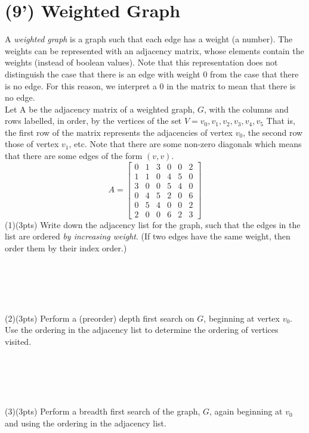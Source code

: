 \documentclass{article}
\begin{document}
\section{(9') Weighted Graph}
A \textit{weighted graph} is a graph such that each edge has a weight (a number). The weights can be represented with an adjacency matrix, whose elements contain the weights (instead of boolean values). Note that this representation does not distinguish the case that there is an edge with weight 0 from the case that there is no edge. For this reason, we interpret a 0 in the matrix to mean that there is no edge.\\
Let A be the adjacency matrix of a weighted graph, $ G $, with the columns and rows labelled, in order, by the vertices of the set $ V = {v_0, v_1, v_2, v_3, v_4, v_5} $ That is, the first row of the matrix represents the adjacencies of vertex $v_0$, the second row those of vertex $v_1$, etc. Note that there are some non-zero diagonals which means that there are some edges of the form $(v, v)$.
$$
A = \left[
\begin{matrix}
0 & 1 & 3 & 0 & 0 & 2 \\
1 & 1 & 0 & 4 & 5 & 0 \\
3 & 0 & 0 & 5 & 4 & 0 \\
0 & 4 & 5 & 2 & 0 & 6 \\
0 & 5 & 4 & 0 & 0 & 2 \\
2 & 0 & 0 & 6 & 2 & 3
\end{matrix}
\right] 
$$
(1)(3pts) Write down the adjacency list for the graph, such that the edges in the list are ordered \textit{by increasing weight}. (If two edges have the same weight, then order them by their index order.)\\
\\
\\
\\
\\
\\
(2)(3pts) Perform a (preorder) depth first search on $G$, beginning at vertex $v_0$. Use the ordering in the adjacency list to determine the ordering of vertices visited. \\
\\
\\
\\
\\
\\
(3)(3pts) Perform a breadth first search of the graph, $ G $, again beginning at $ v_0 $ and using the ordering in the adjacency list.\\
\end{document}
